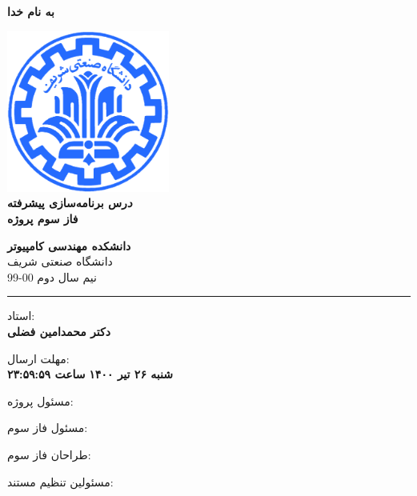 \documentclass[]{article}
\begin{document}
\begin{titlepage}
\begin{center}

\textbf{ \Huge{به نام خدا} }
        
\vspace{0.2cm}

\includegraphics[width=0.4\textwidth]{sharif1.png}\\
\vspace{0.2cm}
\textbf{ \Huge{\emph درس برنامه‌سازی پیشرفته} }\\
\vspace{0.25cm}
\textbf{ \Large{ فاز سوم پروژه} }
\vspace{0.2cm}
       
 
      \large \textbf{دانشکده مهندسی کامپیوتر}\\\vspace{0.1cm}
    \large   دانشگاه صنعتی شریف\\\vspace{0.2cm}
       \large   ﻧﯿﻢ سال دوم 00-99 \\\vspace{0.10cm}
      \noindent\rule[1ex]{\linewidth}{1pt}
استاد:\\
    \textbf{{دکتر محمدامین فضلی}}



    \vspace{0.20cm}

   مهلت ارسال:\\
    \textbf{شنبه ۲۶ تیر ۱۴۰۰}
    \textbf{ساعت ۲۳:۵۹:۵۹}

    \vspace{0.10cm}
مسئول پروژه:\\
    \textbf{}
    
        \vspace{0.10cm}
مسئول فاز سوم:\\
    \textbf{}
    
        \vspace{0.10cm}
طراحان فاز سوم:\\
    \textbf{}
    
        \vspace{0.05cm}
مسئولین تنظیم مستند:\\
    \textbf{}
    

\end{center}
\end{titlepage}
\end{document}
